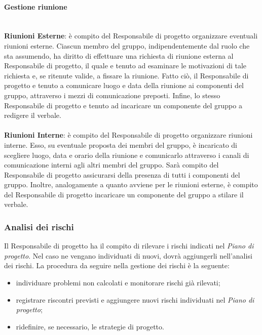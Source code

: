 \documentclass[11pt,a4paper]{article}
\begin{document}
{\paragraph{Gestione riunione\\}
\noindent\\
\textbf{Riunioni Esterne}: è compito del Responsabile di progetto organizzare eventuali riunioni esterne. Ciascun
membro del gruppo, indipendentemente dal ruolo che sta assumendo, ha diritto di effettuare una richiesta di
riunione esterna  al Responsabile di progetto, il quale e tenuto ad esaminare le
motivazioni di tale richiesta e, se ritenute valide, a fissare la riunione. Fatto ciò, il Responsabile di progetto e tenuto a comunicare luogo e data della riunione ai componenti del gruppo, attraverso i mezzi di comunicazione preposti.
Infine, lo stesso Responsabile di progetto e tenuto ad incaricare un componente del gruppo a redigere il verbale. \noindent\\\\
\textbf{Riunioni Interne}: è compito del Responsabile di progetto organizzare riunioni interne. Esso, su eventuale proposta dei membri del gruppo, è incaricato di scegliere luogo, data e orario della riunione e comunicarlo attraverso i canali di comunicazione interni agli altri membri del gruppo. Sarà compito del Responsabile di progetto assicurarsi della presenza di tutti i componenti del gruppo. Inoltre, analogamente a quanto avviene per le riunioni esterne, è compito del Responsabile di progetto incaricare un componente del gruppo a stilare il verbale.



	
	\subsubsection{Analisi dei rischi}
	
	Il Responsabile di progetto ha il compito di rilevare i rischi indicati nel \textit{Piano di progetto}. Nel caso ne vengano individuati di nuovi, dovrà aggiungerli nell'analisi dei rischi. La procedura da seguire nella gestione dei rischi è la seguente:
	\begin{itemize}
		\item individuare problemi non calcolati e monitorare rischi già rilevati;
		\item registrare riscontri previsti e aggiungere nuovi rischi individuati nel \textit{Piano di progetto};
		\item ridefinire, se necessario, le strategie di progetto.
	\end{itemize}
	
}
\end{document}
